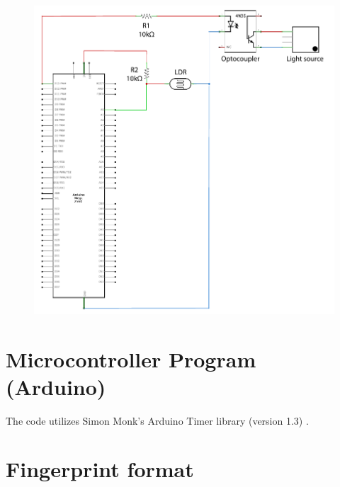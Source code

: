 \documentclass[thesis.tex]{subfiles}
\begin{document}
\begin{figure}[h]
\centering \includegraphics[width=12cm]{images/design_implementation/arduino_schematics.pdf}
\end{figure}





\chapter{Microcontroller Program (Arduino)}
\label{appendix:microcontroller-program}

The code utilizes Simon Monk's Arduino Timer library (version 1.3) \cite{arduino_timer_library}.


\clearpage





\chapter{Fingerprint format}
\label{appendix:fingerprint}
\end{document}
